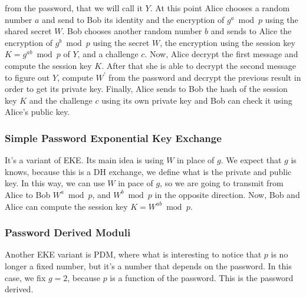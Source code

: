 \documentclass[11pt]{article}
\begin{document}
from the password, that we will call it $Y$. At this point Alice chooses a random number $a$ and send to Bob its identity and the encryption of $g^a \bmod p$ using the shared secret $W$. Bob chooses another random number $b$ and sends to Alice the encryption of $g^b \bmod p$ using the secret $W$, the encryption using the session key $K = g^{ab} \bmod p$ of $Y$, and a challenge $c$. Now, Alice decrypt the first message and compute the session key $K$. After that she is able to decrypt the second message to figure out $Y$, compute $W^{'}$ from the password and decrypt the previous result in order to get its private key. Finally, Alice sends to Bob the hash of the session key $K$ and the challenge $c$ using its own private key and Bob can check it using Alice's public key.
\subsubsection{Simple Password Exponential Key Exchange}
It's a variant of EKE. Its main idea is using $W$ in place of $g$. We expect that $g$ is knows, because this is a DH exchange, we define what is the private and public key. In this way, we can use $W$ in pace of $g$, so we are going to transmit from Alice to Bob $W^a \bmod p$, and $W^b \bmod p$ in the opposite direction. Now, Bob and Alice can compute the session key $K = W^{ab} \bmod p$.
\subsubsection{Password Derived Moduli}
Another EKE variant is PDM, where what is interesting to notice that $p$ is no longer a fixed number, but it's a number that depends on the password. In this case, we fix $g = 2$, because $p$ is a function of the password. This is the password derived.
\end{document}
